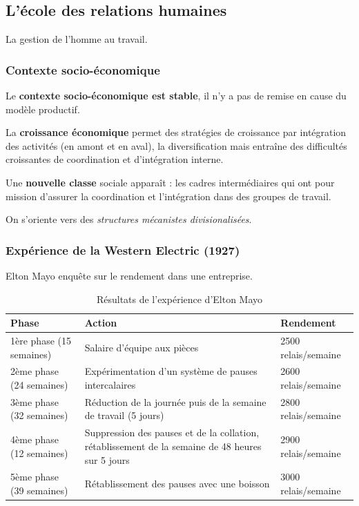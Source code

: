\documentclass[12pt]{article}
\begin{document}
	\subsection{L'école des relations humaines}
	La gestion de l'homme au travail.
	  \subsubsection{Contexte socio-économique}
	  
	  Le \textbf{contexte socio-économique est stable}, il n'y a pas de remise en cause du modèle productif.
	  
	  La \textbf{croissance économique} permet des stratégies de croissance par intégration des activités (en amont et en aval), la diversification mais entraîne des difficultés croissantes de coordination et d'intégration interne.
	  
	  Une \textbf{nouvelle classe} sociale apparaît : les cadres intermédiaires qui ont pour mission d'assurer la coordination et l'intégration dans des groupes de travail.
	  
	  On s'oriente vers des \emph{structures mécanistes divisionalisées}.
	  
	  \subsubsection{Expérience de la Western Electric (1927)}
	  
	  Elton Mayo enquête sur le rendement dans une entreprise.
	  
	  \begin{table}[!ht]
	        \begin{tabular}{p{4.7cm}|p{7.3cm}|p{3.5cm}}
		Phase & Action & Rendement \\
		\hline \hline
		1ère phase (15 semaines) & Salaire d'équipe aux pièces & 2500 relais/semaine \\ \hline
		2ème phase (24 semaines) & Expérimentation d'un système de pauses intercalaires & 2600 relais/semaine \\ \hline
		3ème phase (32 semaines) & Réduction de la journée puis de la semaine de travail (5 jours) & 2800 relais/semaine \\ \hline
		4ème phase (12 semaines) & Suppression des pauses et de la collation, rétablissement de la semaine de 48 heures sur 5 jours & 2900 relais/semaine \\ \hline
		5ème phase (39 semaines) & Rétablissement des pauses avec une boisson & 3000 relais/semaine \\ \hline
	    \end{tabular}
	    \caption{Résultats de l'expérience d'Elton Mayo}
	  \end{table}
	  
\end{document}
